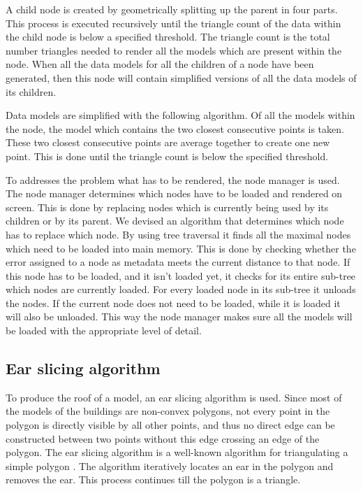 A child node is created by geometrically splitting up the parent in four parts. This process is executed recursively until the triangle count of the data within the child node is below a specified threshold. The triangle count is the total number triangles needed to render all the models which are present within the node. When all the data models for all the children of a node have been generated, then this node will contain simplified versions of all the data models of its children.

Data models are simplified with the following algorithm. Of all the models within the node, the model which contains the two closest consecutive points is taken. These two closest consecutive points are average together to create one new point. This is done until the triangle count is below the specified threshold.

To addresses the problem what has to be rendered, the node manager is used. The node manager determines which nodes have to be loaded and rendered on screen. This is done by replacing nodes which is currently being used by its children or by its parent. We devised an algorithm that determines which node has to replace which node. By using tree traversal it finds all the maximal nodes which need to be loaded into main memory. This is done by checking whether the error assigned to a node as metadata meets the current distance to that node. If this node has to be loaded, and it isn’t loaded yet, it checks for its entire sub-tree which nodes are currently loaded. For every loaded node in its sub-tree it unloads the nodes. If the current node does not need to be loaded, while it is loaded it will also be unloaded. This way the node manager makes sure all the models will be loaded with the appropriate level of detail.

\subsection{Ear slicing algorithm}
\label{subsec:EarSlicingAlgorithm}
To produce the roof of a model, an ear slicing algorithm is used. Since most of the models of the buildings are non-convex polygons, not every point in the polygon is directly visible by all other points, and thus no direct edge can be constructed between two points without this edge crossing an edge of the polygon. The ear slicing algorithm is a well-known algorithm for triangulating a simple polygon \cite{Kajak11}. The algorithm iteratively locates an ear in the polygon and removes the ear. This process continues till the polygon is a triangle.

